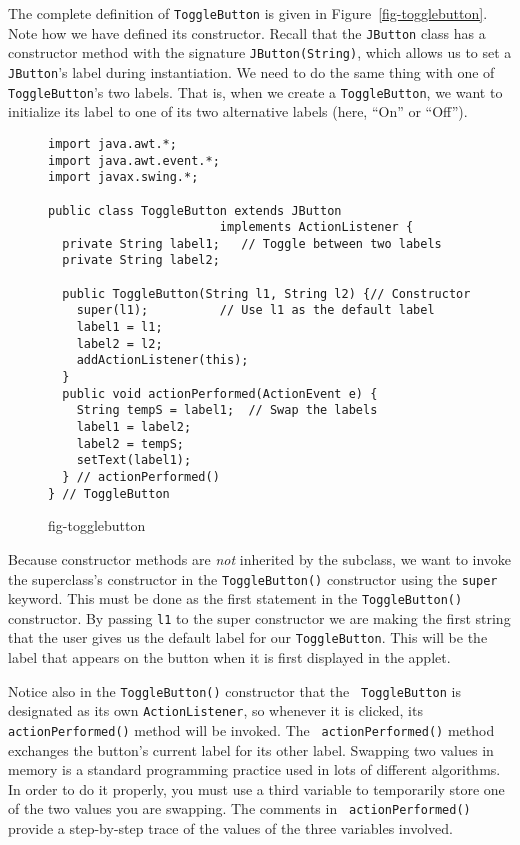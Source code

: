 The complete definition of {\tt ToggleButton} is given in
Figure~\ref{fig-togglebutton}. Note how we have defined its
constructor. Recall that the {\tt JButton} class has a constructor
method with the signature {\tt JButton(String)}, which allows us to
set a {\tt JButton}'s label during instantiation.  We need to do the
same thing with one of {\tt ToggleButton}'s two labels.  That is, when
we create a {\tt ToggleButton}, we want to initialize its label to one
of its two alternative labels (here, ``On'' or ``Off'').

\begin{figure}[b!]
\jjjprogstart
\begin{jjjlisting}
\begin{lstlisting}
import java.awt.*;
import java.awt.event.*;
import javax.swing.*;

public class ToggleButton extends JButton 
                        implements ActionListener {   
  private String label1;   // Toggle between two labels
  private String label2;
   
  public ToggleButton(String l1, String l2) {// Constructor
    super(l1);          // Use l1 as the default label
    label1 = l1; 
    label2 = l2;
    addActionListener(this);
  } 
  public void actionPerformed(ActionEvent e) {
    String tempS = label1;  // Swap the labels
    label1 = label2;
    label2 = tempS;
    setText(label1);
  } // actionPerformed()
} // ToggleButton
\end{lstlisting}
\end{jjjlisting}
{fig-togglebutton}
\end{figure}

Because constructor methods are {\it not} inherited by the subclass,
we want to invoke the superclass's constructor in the {\tt ToggleButton()}
constructor using the {\tt super} keyword. This must be done as the
first statement in the {\tt ToggleButton()} constructor.
By passing {\tt l1} to the super constructor we are making the first string
that the user gives us the default label for our {\tt ToggleButton}.
This will be the label that appears on the button when it is first
displayed in the applet.

Notice also in the {\tt ToggleButton()} constructor that the {\tt
ToggleButton} is designated as its own {\tt ActionListener}, so
whenever it is clicked, its
{\tt actionPerformed()} method will be invoked. The {\tt
actionPerformed()} method exchanges the button's current label for its
other label.  Swapping two values in memory is a standard programming
practice used in lots of different algorithms.  In order to do it
properly, you must use a third variable to temporarily store one of
the two values you are swapping. The comments in {\tt
actionPerformed()} provide a step-by-step trace of the values of the
three variables involved.

